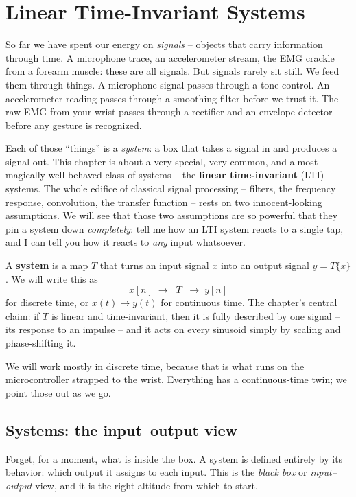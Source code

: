 \chapter{Linear Time-Invariant Systems}

So far we have spent our energy on \emph{signals} -- objects that carry
information through time. A microphone trace, an accelerometer stream, the EMG
crackle from a forearm muscle: these are all signals. But signals rarely sit
still. We feed them through things. A microphone signal passes through a tone
control. An accelerometer reading passes through a smoothing filter before we
trust it. The raw EMG from your wrist passes through a rectifier and an envelope
detector before any gesture is recognized.

Each of those ``things'' is a \emph{system}: a box that takes a signal in and
produces a signal out. This chapter is about a very special, very common, and
almost magically well-behaved class of systems -- the \textbf{linear
time-invariant} (LTI) systems. The whole edifice of classical signal processing
-- filters, the frequency response, convolution, the transfer function -- rests
on two innocent-looking assumptions. We will see that those two assumptions are
so powerful that they pin a system down \emph{completely}: tell me how an LTI
system reacts to a single tap, and I can tell you how it reacts to \emph{any}
input whatsoever.

\begin{focusbox}
A \textbf{system} is a map $T$ that turns an input signal $x$ into an output
signal $y = T\{x\}$. We will write this as
\[
  x[n] \;\longrightarrow\; \boxed{\;T\;}\; \longrightarrow\; y[n]
\]
for discrete time, or $x(t)\to y(t)$ for continuous time. The chapter's central
claim: if $T$ is linear and time-invariant, then it is fully described by one
signal -- its response to an impulse -- and it acts on every sinusoid simply by
scaling and phase-shifting it.
\end{focusbox}

We will work mostly in discrete time, because that is what runs on the
microcontroller strapped to the wrist. Everything has a continuous-time twin;
we point those out as we go.

\section{Systems: the input--output view}
\label{ch12:system-view}

Forget, for a moment, what is inside the box. A system is defined entirely by
its behavior: which output it assigns to each input. This is the \emph{black
box} or \emph{input--output} view, and it is the right altitude from which to
start.

